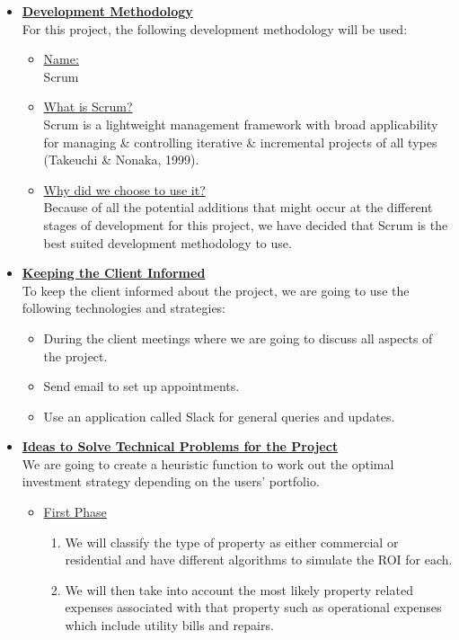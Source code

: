 \documentclass[a4paper,12pt]{article}
\begin{document}
\begin{itemize}
\item {\large \underline{\textbf{Development Methodology}}}\\[0.2cm]
For this project, the following development methodology will be used:

	\begin{itemize}
 		\item \underline{Name:}
		\\[0.1cm]
		 Scrum
		\item  \underline{What is Scrum?}
		\\[0.1cm]
		Scrum is a lightweight management framework with broad applicability for managing \& controlling iterative \& 				incremental projects of all types (Takeuchi \& Nonaka, 1999).
		\item \underline{Why did we choose to use it?}
		\\[0.1cm]
		Because of all the potential additions that might occur at the different stages of development for this project, we 			have decided that Scrum is the best suited development methodology to use.
	\end{itemize}
\bigskip

\item {\large \underline{\textbf{Keeping the Client Informed}}}\\[0.2cm]
To keep the client informed about the project, we are going to use the following technologies and strategies:

	\begin{itemize}
	\item During the client meetings where we are going to discuss all aspects of the project.
	\item Send email to set up appointments.
	\item Use an application called Slack for general queries and updates.
	\end{itemize} 

\bigskip
\item {\large \underline{\textbf{Ideas to Solve Technical Problems for the Project}}}\\[0.2cm]
We are going to create a heuristic function to work out the optimal investment strategy depending on the users’ portfolio. 
	\begin{itemize}

	\item \underline{First Phase}

		\begin{enumerate}
		\item We will classify the type of property as either commercial or residential and have different algorithms to 				simulate the ROI for each. 
		\item We will then take into account the most likely property related expenses associated with that property such 			as operational expenses which include utility bills and repairs.
		\end{enumerate}
	

\end{itemize}
\end{itemize}
\end{document}
